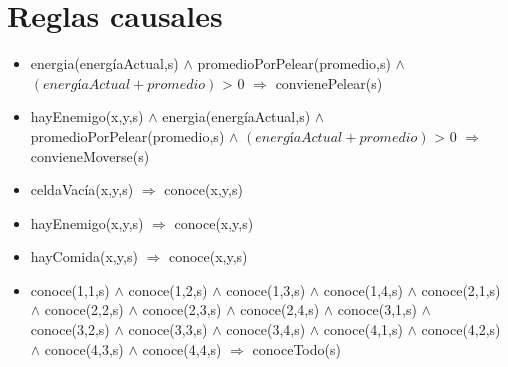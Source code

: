 \section{Reglas causales}

\begin{itemize}

\item  energia(energíaActual,s)
$\land$ promedioPorPelear(promedio,s) $\land$ $(energíaActual + promedio)$ > 0
$\Rightarrow$ convienePelear(s)

\item hayEnemigo(x,y,s) $\land$ energia(energíaActual,s)
$\land$ promedioPorPelear(promedio,s) $\land$ $(energíaActual + promedio)$ > 0
$\Rightarrow$ convieneMoverse(s)

\item celdaVacía(x,y,s) $\Rightarrow$
 conoce(x,y,s)
 
\item hayEnemigo(x,y,s) $\Rightarrow$
 conoce(x,y,s)

\item hayComida(x,y,s) $\Rightarrow$
 conoce(x,y,s)


\item conoce(1,1,s) $\land$ conoce(1,2,s) $\land$ 
 conoce(1,3,s) $\land$ conoce(1,4,s) $\land$ 
 \newline 
 conoce(2,1,s) $\land$ conoce(2,2,s) $\land$ 
 conoce(2,3,s) $\land$ conoce(2,4,s) $\land$ 
 \newline 
 conoce(3,1,s) $\land$ conoce(3,2,s) $\land$ 
 conoce(3,3,s) $\land$ conoce(3,4,s) $\land$ 
 \newline 
 conoce(4,1,s) $\land$ conoce(4,2,s) $\land$ 
 conoce(4,3,s) $\land$ conoce(4,4,s) 
 \newline
 $\Rightarrow$ conoceTodo(s)

\end{itemize}
